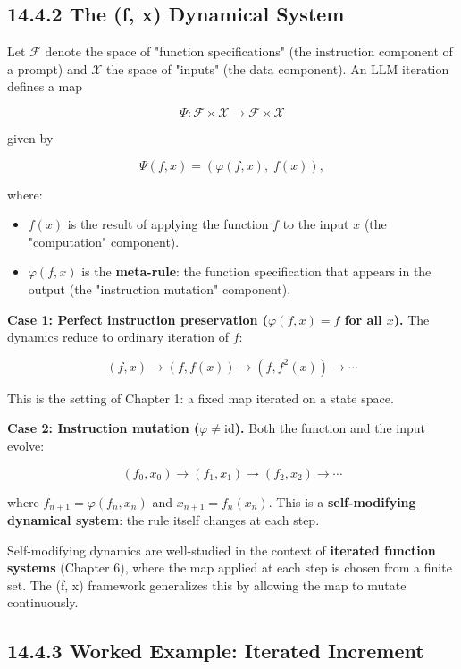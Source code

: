 \subsection{14.4.2 The (f, x) Dynamical System}

\begin{definition}
Let $\mathcal{F}$ denote the space of "function specifications" (the instruction component of a prompt) and $\mathcal{X}$ the space of "inputs" (the data component). An LLM iteration defines a map

\[\Psi: \mathcal{F} \times \mathcal{X} \to \mathcal{F} \times \mathcal{X}\]

given by

\[\Psi(f, x) = (\varphi(f, x), \; f(x)),\]

where:
\begin{itemize}
\item $f(x)$ is the result of applying the function $f$ to the input $x$ (the "computation" component).
\item $\varphi(f, x)$ is the \textbf{meta-rule}: the function specification that appears in the output (the "instruction mutation" component).

\end{itemize}
\textbf{Case 1: Perfect instruction preservation ($\varphi(f, x) = f$ for all $x$).} The dynamics reduce to ordinary iteration of $f$:

\[(f, x) \to (f, f(x)) \to (f, f^2(x)) \to \cdots\]

This is the setting of Chapter 1: a fixed map iterated on a state space.

\textbf{Case 2: Instruction mutation ($\varphi \neq \mathrm{id}$).} Both the function and the input evolve:

\[(f_0, x_0) \to (f_1, x_1) \to (f_2, x_2) \to \cdots\]

where $f_{n+1} = \varphi(f_n, x_n)$ and $x_{n+1} = f_n(x_n)$. This is a \textbf{self-modifying dynamical system}: the rule itself changes at each step.
\end{definition}

\begin{remark}
Self-modifying dynamics are well-studied in the context of \textbf{iterated function systems} (Chapter 6), where the map applied at each step is chosen from a finite set. The (f, x) framework generalizes this by allowing the map to mutate continuously.
\end{remark}

\subsection{14.4.3 Worked Example: Iterated Increment}

